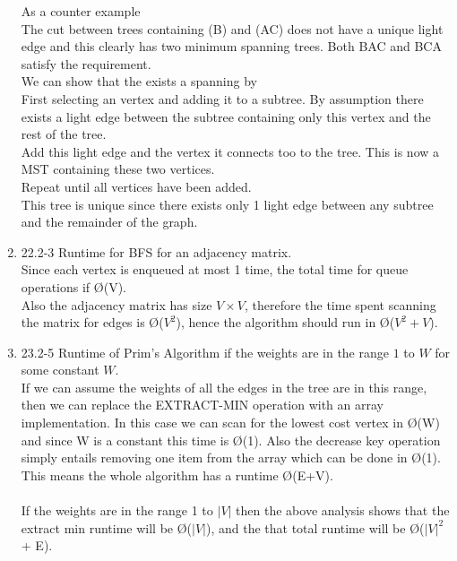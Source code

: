 \documentclass[11pt,fleqn]{article}
\begin{document}
\begin{enumerate}
As a counter example
 \\
The cut between trees containing (B) and (AC) does not have a unique light edge and this clearly has two minimum spanning trees. Both BAC and BCA satisfy the requirement. \\

We can show that the exists a spanning by \\
First selecting an vertex and adding it to a subtree. By assumption there exists a light edge between the subtree containing only this vertex and the rest of the tree. \\
Add this light edge and the vertex it connects too to the tree. This is now a MST containing these two vertices. \\
Repeat until all vertices have been added. \\

This tree is unique since there exists only 1 light edge between any subtree and the remainder of the graph. 

\item 
22.2-3 Runtime for BFS for an adjacency matrix. \\
Since each vertex is enqueued at most 1 time, the total time for queue operations if \O(V). \\
Also the adjacency matrix has size $V \times V$, therefore the time spent scanning the matrix for edges is \O($V^{2}$), hence the algorithm should run in \O($V^{2} + V$). 

\item
23.2-5 Runtime of Prim's Algorithm if the weights are in the range $1$ to $W$ for some constant $W$. \\
If we can assume the weights of all the edges in the tree are in this range, then we can replace the EXTRACT-MIN operation with an array implementation. In this case we can scan for the lowest cost vertex in \O(W) and since W is a constant this time is \O(1). Also the decrease key operation simply entails removing one item from the array which can be done in \O(1). This means the whole algorithm has a runtime \O(E+V). \\
\\
If the weights are in the range 1 to $|V|$ then the above analysis shows that the extract min runtime will be \O($|V|$), and the that total runtime will be \O($|V|^{2}$ + E). 
\end{enumerate}
\end{document}
